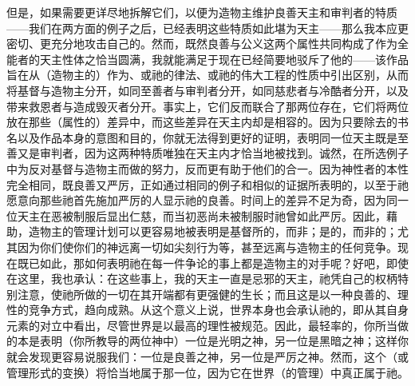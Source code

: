 但是，如果需要更详尽地拆解它们，以便为造物主维护良善天主和审判者的特质——我们在两方面的例子之后，已经表明这些特质如此堪为天主——那么我本应更密切、更充分地攻击自己的。然而，既然良善与公义这两个属性共同构成了作为全能者的天主性体之恰当圆满，我就能满足于现在已经简要地驳斥了他的——该作品旨在从（造物主的）作为、或祂的律法、或祂的伟大工程的性质中引出区别，从而将基督与造物主分开，如同至善者与审判者分开，如同慈悲者与冷酷者分开，以及带来救恩者与造成毁灭者分开。事实上，它们反而联合了那两位存在，它们将两位放在那些（属性的）差异中，而这些差异在天主内却是相容的。因为只要除去的书名以及作品本身的意图和目的，你就无法得到更好的证明，表明同一位天主既是至善又是审判者，因为这两种特质唯独在天主内才恰当地被找到。诚然，在所选例子中为反对基督与造物主而做的努力，反而更有助于他们的合一。因为神性者的本性完全相同，既良善又严厉，正如通过相同的例子和相似的证据所表明的，以至于祂愿意向那些祂首先施加严厉的人显示祂的良善。时间上的差异不足为奇，因为同一位天主在恶被制服后显出仁慈，而当初恶尚未被制服时祂曾如此严厉。因此，藉助，造物主的管理计划可以更容易地被表明是基督所的，而非；是的，而非的；尤其因为你们使你们的神远离一切如尖刻行为等，甚至远离与造物主的任何竞争。现在既已如此，那如何表明祂在每一件争论的事上都是造物主的对手呢？好吧，即使在这里，我也承认：在这些事上，我的天主一直是忌邪的天主，祂凭自己的权柄特别注意，使祂所做的一切在其开端都有更强健的生长；而且这是以一种良善的、理性的竞争方式，趋向成熟。从这个意义上说，世界本身也会承认祂的，即从其自身元素的对立中看出，尽管世界是以最高的理性被规范。因此，最轻率的，你所当做的本是表明（你所教导的两位神中）一位是光明之神，另一位是黑暗之神；这样你就会发现更容易说服我们：一位是良善之神，另一位是严厉之神。然而，这个（或管理形式的变换）将恰当地属于那一位，因为它在世界（的管理）中真正属于祂。\par



\section{}

